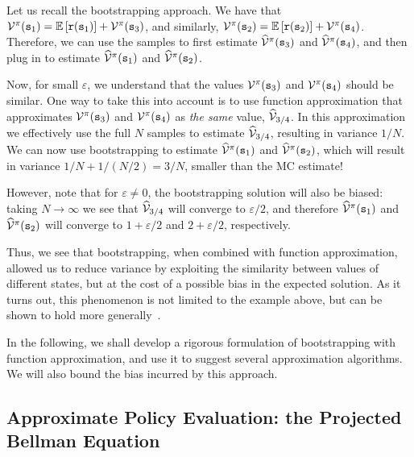 Let us recall the bootstrapping approach. We have that $\mathcal{V}^{\pi}({\tt s}_1) = \mathbb{E}\left[ {\tt r}({\tt s}_1)\right] + \mathcal{V}^{\pi}({\tt s}_3)$, and similarly, $\mathcal{V}^{\pi}({\tt s}_2) = \mathbb{E}\left[ {\tt r}({\tt s}_2)\right] + \mathcal{V}^{\pi}({\tt s}_4)$. Therefore, we can use the samples to first estimate $\widehat{\mathcal{V}}^{\pi}({\tt s}_3)$ and $\widehat{\mathcal{V}}^{\pi}({\tt s}_4)$, and then plug in to estimate $\widehat{\mathcal{V}}^{\pi}({\tt s}_1)$ and $\widehat{\mathcal{V}}^{\pi}({\tt s}_2)$.

Now, for small $\varepsilon$, we understand that the values $\mathcal{V}^{\pi}({\tt s}_3)$ and $\mathcal{V}^{\pi}({\tt s}_4)$ should be similar. One way to take this into account is to use function approximation that approximates $\mathcal{V}^{\pi}({\tt s}_3)$ and $\mathcal{V}^{\pi}({\tt s}_4)$ as \textit{the same} value, $\widehat{\mathcal{V}}_{3/4}$. In this approximation we effectively use the full $N$ samples to estimate $\widehat{\mathcal{V}}_{3/4}$, resulting in variance $1/{N}$. We can now use bootstrapping to estimate $\widehat{\mathcal{V}}^{\pi}({\tt s}_1)$ and $\widehat{\mathcal{V}}^{\pi}({\tt s}_2)$, which will result in variance $1 / {N}+ 1 / ({N}/{2}) = 3/{N}$, smaller than the MC estimate!

However, note that for $\varepsilon \neq 0$, the bootstrapping solution will also be biased: taking $N\to \infty$ we see that $\widehat{\mathcal{V}}_{3/4}$ will converge to $\varepsilon/2$, and therefore $\widehat{\mathcal{V}}^{\pi}({\tt s}_1)$ and $\widehat{\mathcal{V}}^{\pi}({\tt s}_2)$ will converge to $1+\varepsilon/2$ and $2+\varepsilon/2$, respectively.

Thus, we see that bootstrapping, when combined with function approximation, allowed us to reduce variance by exploiting the similarity between values of different states, but at the cost of a possible bias in the expected solution. As it turns out, this phenomenon is not limited to the example above, but can be shown to hold more generally~\cite{kearns2000bias}. 

In the following, we shall develop a rigorous formulation of bootstrapping with function approximation, and use it to suggest several approximation algorithms. We will also bound the bias incurred by this approach.

\subsection{Approximate Policy Evaluation: the Projected Bellman Equation}


